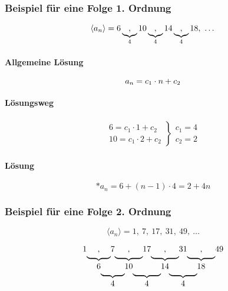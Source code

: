 \subsubsection{Beispiel für eine Folge 1. Ordnung}

\[
	\langle a_n \rangle = 6 \underbrace{,}_{4} 10 \underbrace{,}_{4} 14 \underbrace{,}_{4} 18,\ \ldots \\
\]

\paragraph{Allgemeine Lösung}

\[
	a_n = c_1 \cdot n + c_2 \\
\]

\paragraph{Lösungsweg}

\begin{align*}
	\left.
	\begin{array}{l}
		6 = c_1 \cdot 1 + c_2 \\
		10 = c_1 \cdot 2 + c_2
	\end{array}
	\right \}
	\left.
	\begin{array}{l}
		c_1 = 4 \\
		c_2 = 2
	\end{array}
	\right.
\end{align*}

\paragraph{Lösung}

\[
	*a_n = 6 + (n - 1) \cdot 4 = 2 + 4 n
\]

\subsubsection{Beispiel für eine Folge 2. Ordnung}

\[
	\langle a_n \rangle = 1,\ 7,\ 17,\ 31,\ 49,\ \ldots
\]

\[
	\begin{tabular}{ccccccccccccc}
		1 & ,    & 7    & ,    & 17   & ,    & 31   & ,    & 49 \\[-3pt]
		  & \ubf &      & \ubf &      & \ubf &      & \ubf      \\
		  & 6    &      & 10   &      & 14   &      & 18        \\[-3pt]
		  &      & \ubf &      & \ubf &      & \ubf             \\
		  &      & 4    &      & 4    &      & 4
	\end{tabular}
\]

